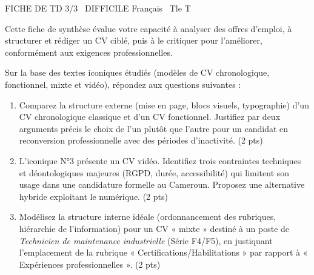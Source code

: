 \documentclass[11pt]{article}
\begin{document}
\begin{tcolorbox}[enhanced,colback=popink,colframe=popink,arc=10pt,boxrule=0pt,left=12pt,right=12pt,top=9pt,bottom=9pt]
{\color{white}\popxbold\small FICHE DE TD 3/3 \textbullet\ DIFFICILE \hfill Français \textbullet\ Tle T\par}
\end{tcolorbox}
\vspace{4pt}
\noindent Cette fiche de synthèse évalue votre capacité à analyser des offres d'emploi, à structurer et rédiger un CV ciblé, puis à le critiquer pour l'améliorer, conformément aux exigences professionnelles.

\begin{exercice}
Sur la base des textes iconiques étudiés (modèles de CV chronologique, fonctionnel, mixte et vidéo), répondez aux questions suivantes :
\begin{enumerate}
    \item Comparez la structure externe (mise en page, blocs visuels, typographie) d'un CV chronologique classique et d'un CV fonctionnel. Justifiez par deux arguments précis le choix de l'un plutôt que l'autre pour un candidat en reconversion professionnelle avec des périodes d'inactivité. (2 pts)
    \item L'iconique N°3 présente un CV vidéo. Identifiez trois contraintes techniques et déontologiques majeures (RGPD, durée, accessibilité) qui limitent son usage dans une candidature formelle au Cameroun. Proposez une alternative hybride exploitant le numérique. (2 pts)
    \item Modélisez la structure interne idéale (ordonnancement des rubriques, hiérarchie de l'information) pour un CV « mixte » destiné à un poste de \textit{Technicien de maintenance industrielle} (Série F4/F5), en justiquant l'emplacement de la rubrique « Certifications/Habilitations » par rapport à « Expériences professionnelles ». (2 pts)
\end{enumerate}
\end{exercice}
\end{document}
